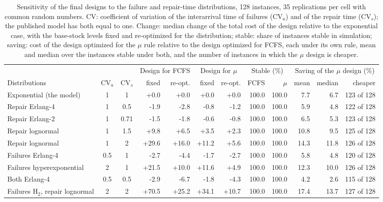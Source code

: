 \begin{table}[!htb]
\centering
\caption{Sensitivity of the final designs to the failure and repair-time distributions, 128 instances, 35 replications per cell with common random numbers. CV: coefficient of variation of the interarrival time of failures (CV$_a$) and of the repair time (CV$_s$); the published model has both equal to one. Change: median change of the total cost of the design relative to the exponential case, with the base-stock levels fixed and re-optimized for the distribution; stable: share of instances stable in simulation; saving: cost of the design optimized for the $\mu$ rule relative to the design optimized for FCFS, each under its own rule, mean and median over the instances stable under both, and the number of instances in which the $\mu$ design is cheaper.}
\label{tab:distribution_sensitivity}
\small
\setlength{\tabcolsep}{3.5pt}
\begin{tabular}{@{}lcc rr rr rr rrr@{}}
\toprule
& & & \multicolumn{2}{c}{Design for FCFS} & \multicolumn{2}{c}{Design for $\mu$} & \multicolumn{2}{c}{Stable (\%)} & \multicolumn{3}{c}{Saving of the $\mu$ design (\%)} \\
\cmidrule(lr){4-5}\cmidrule(lr){6-7}\cmidrule(lr){8-9}\cmidrule(lr){10-12}
Distributions & CV$_a$ & CV$_s$ & fixed & re-opt. & fixed & re-opt. & FCFS & $\mu$ & mean & median & cheaper \\
\midrule
Exponential (the model) & 1 & 1 & +0.0 & +0.0 & +0.0 & +0.0 & 100.0 & 100.0 & 7.7 & 6.7 & 123 of 128 \\
Repair Erlang-4 & 1 & 0.5 & -1.9 & -2.8 & -0.8 & -1.2 & 100.0 & 100.0 & 5.9 & 4.8 & 122 of 128 \\
Repair Erlang-2 & 1 & 0.71 & -1.5 & -1.8 & -0.6 & -0.8 & 100.0 & 100.0 & 6.5 & 5.3 & 123 of 128 \\
Repair lognormal & 1 & 1.5 & +9.8 & +6.5 & +3.5 & +2.3 & 100.0 & 100.0 & 10.8 & 9.5 & 125 of 128 \\
Repair lognormal & 1 & 2 & +29.6 & +16.0 & +11.2 & +5.6 & 100.0 & 100.0 & 14.3 & 11.8 & 126 of 128 \\
Failures Erlang-4 & 0.5 & 1 & -2.7 & -4.4 & -1.7 & -2.7 & 100.0 & 100.0 & 5.8 & 4.8 & 120 of 128 \\
Failures hyperexponential & 2 & 1 & +21.5 & +10.0 & +11.6 & +4.9 & 100.0 & 100.0 & 12.3 & 10.0 & 126 of 128 \\
Both Erlang-4 & 0.5 & 0.5 & -2.9 & -6.7 & -1.8 & -4.3 & 100.0 & 100.0 & 4.2 & 2.6 & 115 of 128 \\
Failures H$_2$, repair lognormal & 2 & 2 & +70.5 & +25.2 & +34.1 & +10.7 & 100.0 & 100.0 & 17.4 & 13.7 & 127 of 128 \\
\bottomrule
\end{tabular}
\end{table}
